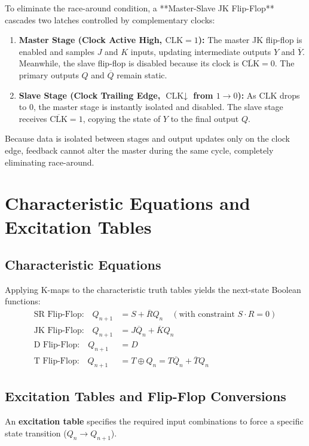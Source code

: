 \begin{derivationbox}
To eliminate the race-around condition, a **Master-Slave JK Flip-Flop** cascades two latches controlled by complementary clocks:
\begin{enumerate}
    \item \textbf{Master Stage (Clock Active High, $\text{CLK} = 1$):} The master JK flip-flop is enabled and samples $J$ and $K$ inputs, updating intermediate outputs $Y$ and $\overline{Y}$. Meanwhile, the slave flip-flop is disabled because its clock is $\overline{\text{CLK}} = 0$. The primary outputs $Q$ and $\overline{Q}$ remain static.
    \item \textbf{Slave Stage (Clock Trailing Edge, $\text{CLK} \downarrow$ from $1 \to 0$):} As $\text{CLK}$ drops to $0$, the master stage is instantly isolated and disabled. The slave stage receives $\overline{\text{CLK}} = 1$, copying the state of $Y$ to the final output $Q$.
\end{enumerate}
Because data is isolated between stages and output updates only on the clock edge, feedback cannot alter the master during the same cycle, completely eliminating race-around.
\end{derivationbox}

\section{Characteristic Equations and Excitation Tables}
\subsection{Characteristic Equations}
Applying K-maps to the characteristic truth tables yields the next-state Boolean functions:
\begin{align}
\text{SR Flip-Flop:} \quad Q_{n+1} &= S + \overline{R} Q_n \quad (\text{with constraint } S \cdot R = 0) \\
\text{JK Flip-Flop:} \quad Q_{n+1} &= J \overline{Q}_n + \overline{K} Q_n \\
\text{D Flip-Flop:} \quad Q_{n+1} &= D \\
\text{T Flip-Flop:} \quad Q_{n+1} &= T \oplus Q_n = T \overline{Q}_n + \overline{T} Q_n
\end{align}

\subsection{Excitation Tables and Flip-Flop Conversions}
An \textbf{excitation table} specifies the required input combinations to force a specific state transition ($Q_n \to Q_{n+1}$).

